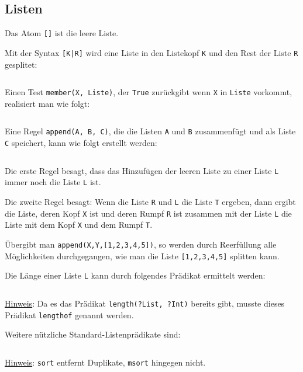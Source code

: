 \subsection{Listen}
Das Atom \texttt{[]} ist die leere Liste.

Mit der Syntax \texttt{[K|R]} wird eine Liste in den Listekopf \texttt{K} und
den Rest der Liste \texttt{R} gesplitet:

\inputminted[numbersep=5pt, tabsize=4]{prolog}{scripts/prolog/liste-basic.pl}

Einen Test \texttt{member(X, Liste)}, der \texttt{True} zurückgibt wenn \texttt{X}
in \texttt{Liste} vorkommt, realisiert man wie folgt:

\inputminted[numbersep=5pt, tabsize=4]{prolog}{scripts/prolog/liste-member.pl}

Eine Regel \texttt{append(A, B, C)}, die die Listen \texttt{A} und \texttt{B} 
zusammenfügt und als Liste \texttt{C} speichert, kann
wie folgt erstellt werden:

\inputminted[numbersep=5pt, tabsize=4]{prolog}{scripts/prolog/liste-append.pl}

Die erste Regel besagt, dass das Hinzufügen der leeren Liste zu einer Liste 
\texttt{L} immer noch die Liste \texttt{L} ist.

Die zweite Regel besagt: Wenn die Liste \texttt{R} und \texttt{L} die Liste \texttt{T}
ergeben, dann ergibt die Liste, deren Kopf \texttt{X} ist und deren Rumpf \texttt{R}
ist zusammen mit der Liste \texttt{L} die Liste mit dem Kopf \texttt{X} und dem
Rumpf \texttt{T}.

Übergibt man \texttt{append(X,Y,[1,2,3,4,5])}, so werden durch Reerfüllung alle
Möglichkeiten durchgegangen, wie man die Liste \texttt{[1,2,3,4,5]} splitten kann.

Die Länge einer Liste \texttt{L} kann durch folgendes Prädikat ermittelt werden:%

\inputminted[numbersep=5pt, tabsize=4]{prolog}{scripts/prolog/list-length.pl}

\underline{Hinweis}: Da es das Prädikat \texttt{length(?List, ?Int)} bereits gibt, 
musste dieses Prädikat \texttt{lengthof} genannt werden.

Weitere nützliche Standard-Listenprädikate sind:
\inputminted[numbersep=5pt, tabsize=4]{prolog}{scripts/prolog/standard-list-predicates.pl}

\underline{Hinweis}: \texttt{sort} entfernt Duplikate, \texttt{msort} hingegen nicht.

